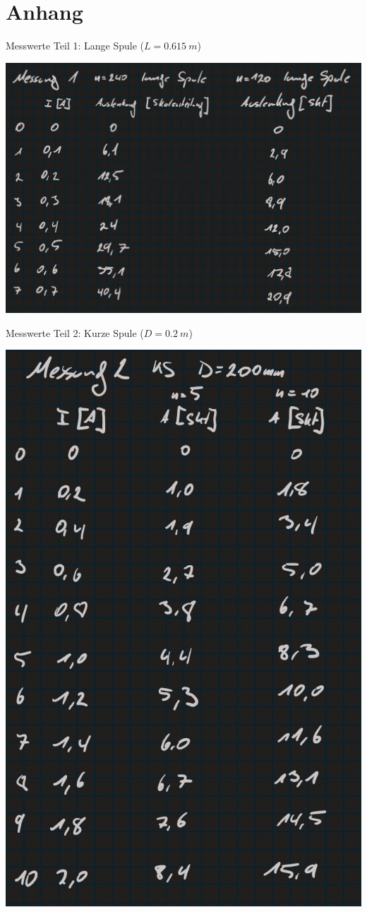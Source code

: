 \chapter{Anhang}
%
\begin{table}[ht]
    \centering
    \caption[Messung lange Spule]{Messwerte Teil 1: Lange Spule (\(L=\SI{0,615}{m}\))}
    \includegraphics[width=.8\textwidth]{messungen/messung1.jpg}
    \label{tab:mess1}
\end{table}
%
\begin{table}[ht]
    \centering
    \caption[Messung kurze Spule \(D=\SI{0,2}{m}\)]{Messwerte Teil 2: Kurze Spule (\(D=\SI{0,2}{m}\))}
    \includegraphics[height=.75\textheight]{messungen/messung2.jpg}
    \label{tab:mess2}
\end{table}
